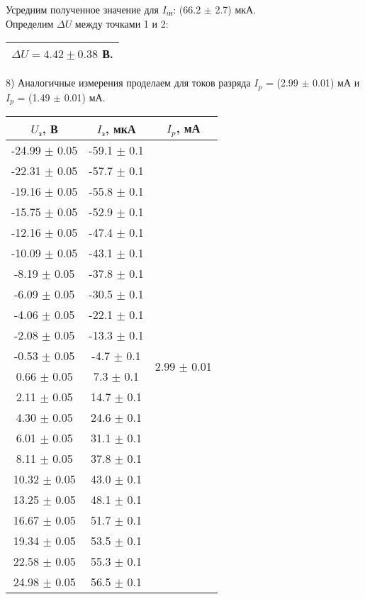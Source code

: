 \documentclass[a4paper,12pt]{article}
\begin{document}
Усредним полученное значение для $I_{i\text{н}}$: (66.2 $\pm$ 2.7) мкА. \\

Определим $\Delta U$ между точками 1 и 2: \begin{tabular}{|c|} \hline $\Delta U = 4.42 \pm 0.38$ В.\\ \hline \end{tabular}

\par8) Аналогичные измерения проделаем для токов разряда $I_p$ = (2.99 $\pm$ 0.01) мА и $I_p$ = (1.49 $\pm$ 0.01) мА.\\

\begin{tabular}{|c|c|c|}
	\hline
	$U_{\text{з}}$, В & $I_{\text{з}}$, мкА &  $I_p$, мА \\
	\hline
	-24.99 $\pm$ 0.05 & -59.1 $\pm$ 0.1 & \multirow{22}{*}{2.99 $\pm$ 0.01}\\
	\cline{1-2}
	-22.31 $\pm$ 0.05 & -57.7 $\pm$ 0.1 & \\
	\cline{1-2}
	-19.16 $\pm$ 0.05 & -55.8 $\pm$ 0.1 & \\
	\cline{1-2}
	-15.75 $\pm$ 0.05 & -52.9 $\pm$ 0.1 & \\
	\cline{1-2}
	-12.16 $\pm$ 0.05 & -47.4 $\pm$ 0.1 & \\
	\cline{1-2}
	-10.09 $\pm$ 0.05 & -43.1 $\pm$ 0.1 & \\
	\cline{1-2}
	-8.19 $\pm$ 0.05 & -37.8 $\pm$ 0.1 & \\
	\cline{1-2}
	-6.09 $\pm$ 0.05 & -30.5 $\pm$ 0.1 & \\
	\cline{1-2}
	-4.06 $\pm$ 0.05 & -22.1 $\pm$ 0.1 & \\
	\cline{1-2}
	-2.08 $\pm$ 0.05 & -13.3 $\pm$ 0.1 & \\
	\cline{1-2}
	-0.53 $\pm$ 0.05 & -4.7 $\pm$ 0.1 & \\
	\cline{1-2}
	0.66 $\pm$ 0.05 & 7.3 $\pm$ 0.1 & \\
	\cline{1-2}
	2.11 $\pm$ 0.05 & 14.7 $\pm$ 0.1 & \\
	\cline{1-2}
	4.30 $\pm$ 0.05 & 24.6 $\pm$ 0.1 & \\
	\cline{1-2}
	6.01 $\pm$ 0.05 & 31.1 $\pm$ 0.1 & \\
	\cline{1-2}
	8.11 $\pm$ 0.05 & 37.8 $\pm$ 0.1 & \\
	\cline{1-2}
	10.32 $\pm$ 0.05 & 43.0 $\pm$ 0.1 & \\
	\cline{1-2}
	13.25 $\pm$ 0.05 & 48.1 $\pm$ 0.1 & \\
	\cline{1-2}
	16.67 $\pm$ 0.05 & 51.7 $\pm$ 0.1 & \\
	\cline{1-2}
	19.34 $\pm$ 0.05 & 53.5 $\pm$ 0.1 & \\
	\cline{1-2}
	22.58 $\pm$ 0.05 & 55.3 $\pm$ 0.1 & \\
	\cline{1-2}
	24.98 $\pm$ 0.05 & 56.5 $\pm$ 0.1 & \\
	\hline
\end{tabular}
\end{document}
